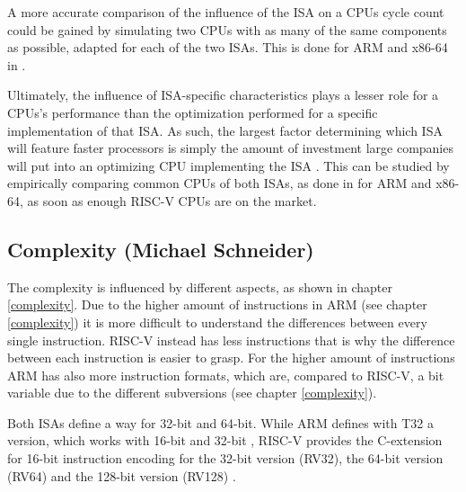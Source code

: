 \documentclass[conference]{IEEEtran}
\begin{document}
	A more accurate comparison of the influence of the \gls{ISA} on a \gls{CPU}s cycle count could be gained
	by simulating two \glspl{CPU} with as many of the same components as possible, adapted for each of the two \glspl{ISA}.
	This is done for ARM and x86-64 in \cite{Akram2017}.

	Ultimately, the influence of \gls{ISA}-specific characteristics plays a lesser role for a \glspl{CPU}'s performance
	than the optimization performed for a specific implementation of that \gls{ISA}.
	As such, the largest factor determining which \gls{ISA} will feature faster processors is simply the amount of investment
	large companies will put into an optimizing \gls{CPU} implementing the \gls{ISA} \cite{Blem2013}.
	This can be studied by empirically comparing common \glspl{CPU} of both \glspl{ISA}, as done in \cite{Blem2013} for ARM and
	x86-64, as soon as enough RISC-V \glspl{CPU} are on the market.
	
	\subsection{Complexity (Michael Schneider)}
	The complexity is influenced by different aspects, as shown in chapter \ref{complexity}.
	 Due to the higher amount of instructions in ARM (see chapter \ref{complexity}) it is more difficult to understand the differences between every single instruction. RISC-V instead has less instructions that is why the difference between each instruction is easier to grasp. 
	 For the higher amount of instructions ARM has also more instruction formats, which are, compared to RISC-V, a bit variable due to the different subversions (see chapter \ref{complexity}).
	
	Both \glspl{ISA} define a way for 32-bit and 64-bit. While ARM defines with T32 a version, which works with 16-bit and 32-bit \cite[page 38]{Arm2020}, RISC-V provides the C-extension for 16-bit instruction encoding for the 32-bit version (RV32), the 64-bit version (RV64) and the 128-bit version (RV128) \cite[page67]{Waterman2017}.
\end{document}
